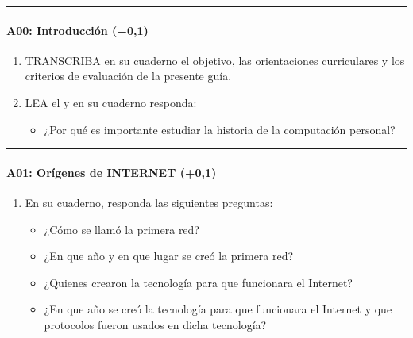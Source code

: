 \documentclass[letterpaper,10pt,spanish]{sphinxmanual}
\begin{document}
\bigskip\hrule\bigskip



\paragraph{A00: Introducción (+0,1)}
\label{\detokenize{cursos/informatica10/periodo01/G01:a00-introduccion-0-1}}
\sphinxAtStartPar
{}
\begin{enumerate}
%
\item {} 
\sphinxAtStartPar
TRANSCRIBA en su cuaderno el objetivo, las orientaciones curriculares y los criterios de evaluación de la presente guía.

\item {} 
\sphinxAtStartPar
LEA el  y en su cuaderno responda:
\begin{itemize}
\item {} 
\sphinxAtStartPar
¿Por qué es importante estudiar la historia de la computación personal?

\end{itemize}

\end{enumerate}


\bigskip\hrule\bigskip



\paragraph{A01: Orígenes de INTERNET (+0,1)}
\label{\detokenize{cursos/informatica10/periodo01/G01:a01-origenes-de-internet-0-1}}
\sphinxAtStartPar
{}
\begin{enumerate}
%
\item {} 
\sphinxAtStartPar
En su cuaderno, responda las siguientes preguntas:
\begin{itemize}
\item {} 
\sphinxAtStartPar
¿Cómo se llamó la primera red?

\item {} 
\sphinxAtStartPar
¿En que año y en que lugar se creó la primera red?

\item {} 
\sphinxAtStartPar
¿Quienes crearon la tecnología para que funcionara el Internet?

\item {} 
\sphinxAtStartPar
¿En que año se creó la tecnología para que funcionara el Internet y que protocolos fueron usados en dicha tecnología?

\end{itemize}

\end{enumerate}
\end{document}
